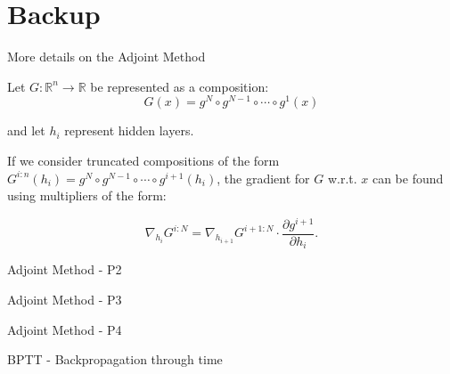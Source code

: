 \documentclass{beamer}
\def\R{\mathbb R}
\begin{document}
\section{Backup}
\begin{frame}{More details on the Adjoint Method}

    Let $G: \R^n \rightarrow \R$ be represented as a composition:
    $$G(x) = g^N \circ g^{N-1} \circ \cdots \circ g^1(x)$$

    and let $h_i$ represent hidden layers.

    If we consider truncated compositions of the form $G^{i:n}(h_i) = g^N \circ g^{N-1} \circ \cdots \circ g^{i + 1}(h_i)$, the gradient for $G$ w.r.t. $x$ can be found using multipliers of the form:

    \begin{equation}
    \label{nablastep}
    \nabla_{\! h_{i}} G^{i:N}=\nabla_{\! h_{i+1}}G^{i+1:N}\cdot \frac{\partial g^{i+1}}{\partial h_{i}}.
    \end{equation}
\end{frame}

\begin{frame}{Adjoint Method - P2}
    
\end{frame}

\begin{frame}{Adjoint Method - P3}
    
\end{frame}

\begin{frame}{Adjoint Method - P4}
    
\end{frame}

\begin{frame}{BPTT - Backpropagation through time}
    
\end{frame}
\end{document}
